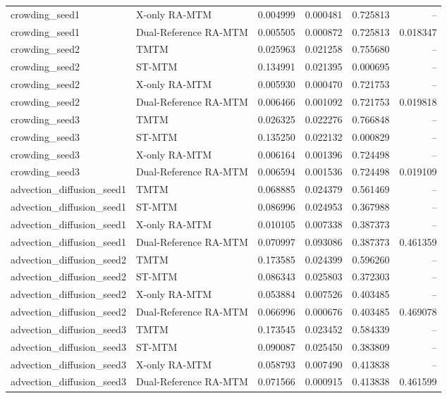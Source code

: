 \begin{tabular}{llrrrr}
crowding\_seed1 & X-only RA-MTM & 0.004999 & 0.000481 & 0.725813 & -- \\
crowding\_seed1 & Dual-Reference RA-MTM & 0.005505 & 0.000872 & 0.725813 & 0.018347 \\
crowding\_seed2 & TMTM & 0.025963 & 0.021258 & 0.755680 & -- \\
crowding\_seed2 & ST-MTM & 0.134991 & 0.021395 & 0.000695 & -- \\
crowding\_seed2 & X-only RA-MTM & 0.005930 & 0.000470 & 0.721753 & -- \\
crowding\_seed2 & Dual-Reference RA-MTM & 0.006466 & 0.001092 & 0.721753 & 0.019818 \\
crowding\_seed3 & TMTM & 0.026325 & 0.022276 & 0.766848 & -- \\
crowding\_seed3 & ST-MTM & 0.135250 & 0.022132 & 0.000829 & -- \\
crowding\_seed3 & X-only RA-MTM & 0.006164 & 0.001396 & 0.724498 & -- \\
crowding\_seed3 & Dual-Reference RA-MTM & 0.006594 & 0.001536 & 0.724498 & 0.019109 \\
advection\_diffusion\_seed1 & TMTM & 0.068885 & 0.024379 & 0.561469 & -- \\
advection\_diffusion\_seed1 & ST-MTM & 0.086996 & 0.024953 & 0.367988 & -- \\
advection\_diffusion\_seed1 & X-only RA-MTM & 0.010105 & 0.007338 & 0.387373 & -- \\
advection\_diffusion\_seed1 & Dual-Reference RA-MTM & 0.070997 & 0.093086 & 0.387373 & 0.461359 \\
advection\_diffusion\_seed2 & TMTM & 0.173585 & 0.024399 & 0.596260 & -- \\
advection\_diffusion\_seed2 & ST-MTM & 0.086343 & 0.025803 & 0.372303 & -- \\
advection\_diffusion\_seed2 & X-only RA-MTM & 0.053884 & 0.007526 & 0.403485 & -- \\
advection\_diffusion\_seed2 & Dual-Reference RA-MTM & 0.066996 & 0.000676 & 0.403485 & 0.469078 \\
advection\_diffusion\_seed3 & TMTM & 0.173545 & 0.023452 & 0.584339 & -- \\
advection\_diffusion\_seed3 & ST-MTM & 0.090087 & 0.025450 & 0.383809 & -- \\
advection\_diffusion\_seed3 & X-only RA-MTM & 0.058793 & 0.007490 & 0.413838 & -- \\
advection\_diffusion\_seed3 & Dual-Reference RA-MTM & 0.071566 & 0.000915 & 0.413838 & 0.461599 \\

\end{tabular}
